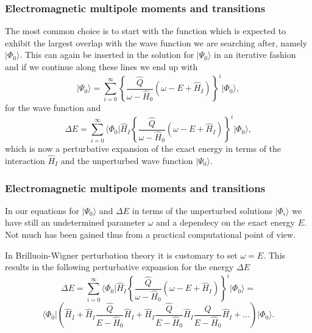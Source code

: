 \documentclass{beamer}
\begin{document}
\begin{frame}
\frametitle{Electromagnetic multipole moments and transitions}

\begin{block}{}
 The most common choice is to start with the function which is expected to exhibit the largest overlap with the wave function we are searching after, namely $\vert \Phi_0\rangle$. This can again be inserted in the solution for $\vert \Psi_0\rangle$ in an iterative fashion and if we continue along these lines we end up with
\[
\vert \Psi_0\rangle=\sum_{i=0}^{\infty}\left\{\frac{\hat{Q}}{\omega-\hat{H}_0}\left(\omega-E+\hat{H}_I\right)\right\}^i\vert \Phi_0\rangle, 
\]
for the wave function and
\[
\Delta E=\sum_{i=0}^{\infty}\langle \Phi_0\vert \hat{H}_I\left\{\frac{\hat{Q}}{\omega-\hat{H}_0}\left(\omega-E+\hat{H}_I\right)\right\}^i\vert \Phi_0\rangle, 
\]
which is now  a perturbative expansion of the exact energy in terms of the interaction
$\hat{H}_I$ and the unperturbed wave function $\vert \Psi_0\rangle$.
\end{block}
\end{frame}

\begin{frame}
\frametitle{Electromagnetic multipole moments and transitions}

\begin{block}{}
In our equations for $\vert \Psi_0\rangle$ and $\Delta E$ in terms of the unperturbed
solutions $\vert \Phi_i\rangle$  we have still an undetermined parameter $\omega$
and a dependecy on the exact energy $E$. Not much has been gained thus from a practical computational point of view. 

In Brilluoin-Wigner perturbation theory it is customary to set $\omega=E$. This results in the following perturbative expansion for the energy $\Delta E$
\[
\Delta E=\sum_{i=0}^{\infty}\langle \Phi_0\vert \hat{H}_I\left\{\frac{\hat{Q}}{\omega-\hat{H}_0}\left(\omega-E+\hat{H}_I\right)\right\}^i\vert \Phi_0\rangle=
\]
\[
\langle \Phi_0\vert \left(\hat{H}_I+\hat{H}_I\frac{\hat{Q}}{E-\hat{H}_0}\hat{H}_I+
\hat{H}_I\frac{\hat{Q}}{E-\hat{H}_0}\hat{H}_I\frac{\hat{Q}}{E-\hat{H}_0}\hat{H}_I+\dots\right)\vert \Phi_0\rangle. 
\]
\end{block}
\end{frame}
\end{document}
